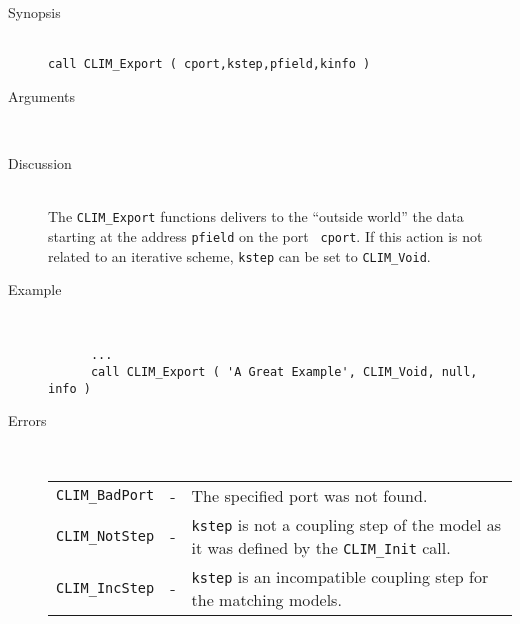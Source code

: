 %
%
\begin{description}
  \item[Synopsis]~ \\[10pt]
    {\tt call CLIM\_Export ( cport,kstep,pfield,kinfo )}
  \item[Arguments]~
  \item[Discussion]~\\[10pt]
    The {\tt CLIM\_Export} functions delivers to the ``outside world''
    the data starting at the address {\tt pfield} on the port {\tt
    cport}. If this action is not related to an iterative scheme, 
    {\tt kstep} can be set to {\tt CLIM\_Void}.
  \item[Example]~
    \begin{verbatim}
      ...
      call CLIM_Export ( 'A Great Example', CLIM_Void, null, info )
    \end{verbatim}
  \item[Errors]~\\[10pt]
    \begin{tabular}{l l p{10cm} }
      {\tt CLIM\_BadPort} & - & The specified port was not found. \\
      {\tt CLIM\_NotStep} & - & {\tt kstep} is not a coupling step of
the model as it was defined by the {\tt CLIM\_Init} call. \\
      {\tt CLIM\_IncStep} & - & {\tt kstep} is an incompatible coupling
step for the matching models. \\

\end{tabular}
\end{description}
